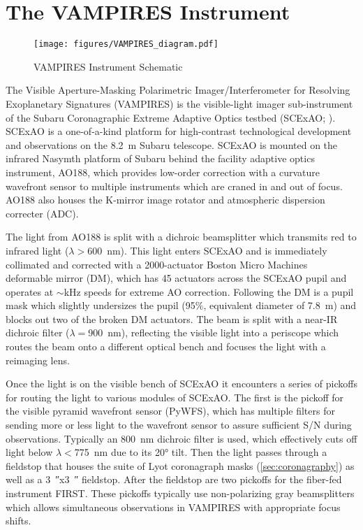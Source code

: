 \section{The VAMPIRES Instrument}\label{sec:design}

\begin{figure*}[t]
    \centering
    \texttt{[image: figures/VAMPIRES\_diagram.pdf]}
    \caption{VAMPIRES Instrument Schematic}
    \label{fig:schematic}
\end{figure*}

The Visible Aperture-Masking Polarimetric Imager/Interferometer for Resolving Exoplanetary Signatures (VAMPIRES) is the visible-light imager sub-instrument of the Subaru Coronagraphic Extreme Adaptive Optics testbed (SCExAO; \citet{jovanovic_subaru_2015}). SCExAO is a one-of-a-kind platform for high-contrast technological development and observations on the \SI{8.2}{\meter} Subaru telescope. SCExAO is mounted on the infrared Nasymth platform of Subaru behind the facility adaptive optics instrument, AO188, which provides low-order correction with a curvature wavefront sensor to multiple instruments which are craned in and out of focus. AO188 also houses the K-mirror image rotator and atmospheric dispersion correcter (ADC).

The light from AO188 is split with a dichroic beamsplitter which transmits red to infrared light ($\lambda >$\SI{600}{\nano\meter}). This light enters SCExAO and is immediately collimated and corrected with a 2000-actuator Boston Micro Machines deformable mirror (DM), which has 45 actuators across the SCExAO pupil and operates at $\sim$\si{\kilo\hertz} speeds for extreme AO correction. Following the DM is a pupil mask which slightly undersizes the pupil (95\%, equivalent diameter of \SI{7.8}{\meter}) and blocks out two of the broken DM actuators. The beam is split with a near-IR dichroic filter ($\lambda=$\SI{900}{\nano\meter}), reflecting the visible light into a periscope which routes the beam onto a different optical bench and focuses the light with a reimaging lens.

Once the light is on the visible bench of SCExAO it encounters a series of pickoffs for routing the light to various modules of SCExAO. The first is the pickoff for the visible pyramid wavefront sensor (PyWFS), which has multiple filters for sending more or less light to the wavefront sensor to assure sufficient S/N during observations. Typically an \SI{800}{\nano\meter} dichroic filter is used, which effectively cuts off light below $\lambda <$\SI{775}{\nano\meter} due to its \ang{20} tilt. Then the light passes through a fieldstop that houses the suite of Lyot coronagraph masks (\autoref{sec:coronagraphy}) as well as a \SI{3}{\arcsecond}x\SI{3}{\arcsecond} fieldstop. After the fieldstop are two pickoffs for the fiber-fed instrument FIRST. These pickoffs typically use non-polarizing gray beamsplitters which allows simultaneous observations in VAMPIRES with appropriate focus shifts.

